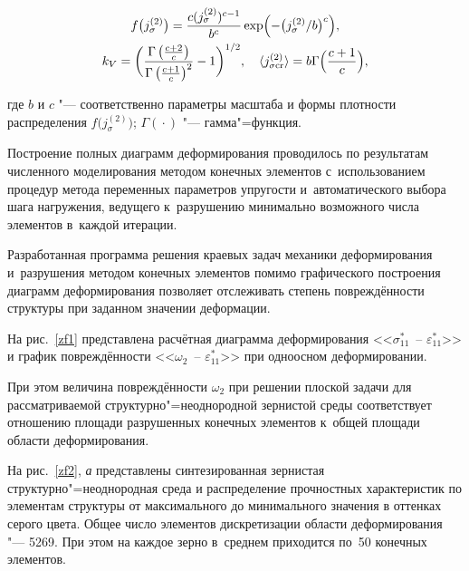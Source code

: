 \begin{gather*}

  f \bigl( j^{(2)}_{\sigma} \bigr) = \frac{c( {j^{(2)}_{\sigma}} )^{c-1}}{b^c} \exp 

  \Bigl(- \bigl( { j^{(2)}_{\sigma}}/{b} \bigr)^c \Bigr),\\

 k_{V}=\biggl(\frac{\Gamma \left( \frac{c+2}{c} \right)}{\Gamma \left( \frac{c+1}{c} \right)^2}-1 \biggr)^{1/2},

\quad 

  \langle {j^{(2)}_{\sigma \rm cr}} \rangle = b \Gamma \Bigl(\frac{c+1}{c} \Bigr),

\end{gather*}

где $b$ и $c$ "--- соответственно параметры масштаба и формы плотности распределения $ f \bigl( j^{(2)}_{\sigma}\bigr)$; $\Gamma ({}\cdot{})$ "--- гамма"=функция.	



Построение полных диаграмм деформирования проводилось по результатам численного моделирования методом конечных элементов с~использованием процедур метода переменных параметров упругости и~автоматического выбора шага нагружения, ведущего к~разрушению минимально возможного числа элементов в~каждой итерации. 

Разработанная программа решения краевых задач механики деформирования и~разрушения методом конечных элементов помимо графического построения диаграмм деформирования позволяет отслеживать степень повреждённости структуры при заданном значении деформации.



На рис.~\ref{zf1} представлена расчётная диаграмма деформирования <<$\sigma^*_{11}$~-- $\varepsilon^*_{11}$>> и график повреждённости <<$\omega_{2}$~-- $\varepsilon^*_{11}$>> при одноосном деформировании. 

При этом величина повреждённости $\omega_{2}$ при решении плоской задачи для рассматриваемой структурно"=неоднородной зернистой среды соответствует отношению площади разрушенных конечных элементов к~общей площади области деформирования. 

На рис.~\ref{zf2}, {\sl а} представлены синтезированная зернистая структурно"=неоднородная среда и распределение прочностных характеристик по элементам структуры от максимального до минимального значения в оттенках серого цвета. Общее число элементов дискретизации области деформирования "--- 5269. При этом на каждое зерно в~среднем приходится по~50 конечных элементов.



